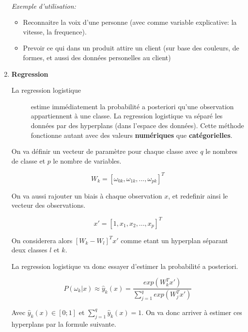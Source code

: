 \documentclass[a4paper, 11pt, onecolumn]{article}
\begin{document}
\begin{enumerate}
\paragraph{}\textit{Exemple d'utilisation:}
\begin{itemize}
\item Reconnaitre la voix d'une personne (avec comme variable
explicative: la vitesse, la frequence).

\item Prevoir ce qui dans un produit attire un client (sur base des couleurs,
de formes, et aussi des données personelles au client)
\end{itemize}
\item \textbf{Regression}

  \begin{description}
    \item[La regression logistique] estime immédiatement la probabilité a posteriori qu'une observation appartiennent à une classe. La regression logistique va séparé les données par des hyperplans (dans l'espace des données). Cette méthode fonctionne autant avec des valeurs \textbf{numériques} que \textbf {catégorielles}.
  \end{description}

On va définir un vecteur de paramètre pour chaque classe avec $q$ le nombres de classe et $p$ le nombre de variables.

$$W_k = [\omega_{0k}, \omega_{1k}, ..., \omega_{pk}]^T$$

On va aussi rajouter un biais à chaque observation $x$, et redefinir ainsi le vecteur des observations.

$$x' = [1, x_1, x_2, ..., x_p]^T$$

On considerera alors $[W_k-W_l]^T x'$ comme etant un hyperplan séparant deux classes $l$ et $k$.

La regression logistique va donc essayer d'estimer la probabilité a posteriori.

$$P(\omega_k|x) \approx \widehat{y}_k(x) = \frac{exp(W_k^Tx')}{\sum_{j=1}^q exp(W_j^Tx')}$$

Avec $\widehat{y}_k(x) \in [0;1]$ et $\sum_{j=1}^q \widehat{y}_k(x) = 1$. On va donc arriver à estimer ces hyperplans par la formule suivante.


\end{enumerate}
\end{document}
